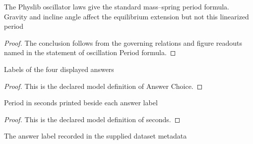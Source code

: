 \begin{lemma}
  \label{lem:physics:phyx-mini-0257:phyxminiproblems-problemphyxmini0257-oscillationperiod-formula}
  The Physlib oscillator laws give the standard mass--spring period formula. Gravity and incline angle affect the equilibrium extension but not this linearized period
\end{lemma}
\begin{proof}
  The conclusion follows from the governing relations and figure readouts named in the statement of oscillation Period formula.
\end{proof}
\begin{definition}
  \label{def:physics:phyx-mini-0257:phyxminiproblems-problemphyxmini0257-answerchoice}
  Labels of the four displayed answers
\end{definition}
\begin{proof}
  This is the declared model definition of Answer Choice.
\end{proof}
\begin{definition}[seconds]
  \label{def:physics:phyx-mini-0257:phyxminiproblems-problemphyxmini0257-answerchoice-seconds}
  Period in seconds printed beside each answer label
\end{definition}
\begin{proof}
  This is the declared model definition of seconds.
\end{proof}
\begin{definition}
  \label{def:physics:phyx-mini-0257:phyxminiproblems-problemphyxmini0257-recordedanswerchoice}
  The answer label recorded in the supplied dataset metadata
\end{definition}
